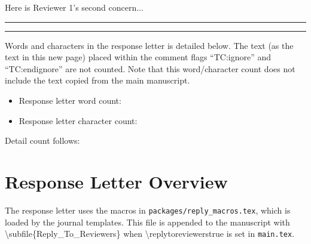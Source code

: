 \documentclass[main.tex]{subfiles}
\begin{document}
\begin{point}
     Here is Reviewer 1's second concern...
\end{point}


\reviewersection
{}



\begin{guidance}
\vspace{2cm} \hrule \vspace{0.2cm} \hrule \vspace{0.5cm}

\color{magenta}

Words and characters in the response letter is detailed below.
The text (as the text in this new page) placed within the comment flags ``TC:ignore'' and ``TC:endignore'' are not counted.
Note that this word/character count does not include the text copied from the main manuscript.

\begin{itemize}
    \item Response letter word count: 
    \item Response letter character count: 
\end{itemize}

\par{Detail count follows:}

\color{black}

\twocolumn


\section{Response Letter Overview}\label{sec:overview}
The response letter uses the macros in \texttt{packages/reply\_macros.tex}, which is loaded by the journal templates. This file is appended to the manuscript with \textbackslash subfile\{Reply\_To\_Reviewers\} when \textbackslash replytoreviewerstrue is set in \texttt{main.tex}.


\end{guidance}
\end{document}
